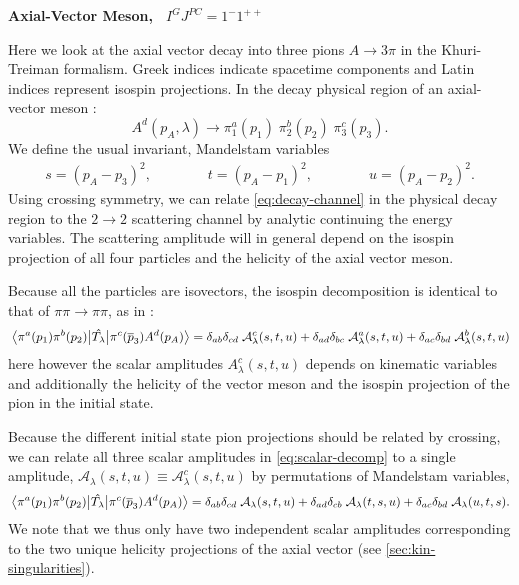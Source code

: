 \documentclass[10pt, aps,prd,amsmath,amssymb,superscriptaddress,onecolumn,
nofootinbib,showpacs,preprintnumbers]{revtex4-1}
\begin{document}
\begin{center}
\large \textbf{Axial-Vector Meson, \, \(I^G J^{PC} = 1^-1^{++}\)}
\end{center}
Here we look at the axial vector decay into three pions \(A \to 3\pi\) in the Khuri-Treiman formalism. Greek indices indicate spacetime components and Latin indices represent isospin projections.
In the decay physical region of an axial-vector meson :
  \begin{equation}
    \label{eq:decay-channel}
    A^d(p_A, \lambda) \rightarrow \pi_1^a(p_1)\;  \pi_2^b(p_2) \; \pi^c_3(p_3).
  \end{equation}
We define the usual invariant, Mandelstam variables
  \begin{align}
    s = (p_A - p_3)^2,  \qquad \qquad t = (p_A - p_1)^2,  \qquad  \qquad u = (p_A-p_2)^2.
  \end{align}
Using crossing symmetry, we can relate \cref{eq:decay-channel} in the physical decay region to the \(2\to2\) scattering channel by analytic continuing the energy variables. The scattering amplitude will in general depend on the isospin projection of all four particles and the helicity of the axial vector meson.

Because all the particles are isovectors, the isospin decomposition is identical to that of \(\pi\pi\to\pi\pi\), as in \cite{Albaladejo2018}:
  \begin{equation}
    \mel{\pi^a(p_1)\pi^b(p_2)}{\hat{T_\lambda}}{\pi^c(\overline{p}_3)A^d(p_A)} = \delta_{ab}\delta_{cd} \; \mathcal{A}^{c}_\lambda(s,t,u) + \delta_{ad}\delta_{bc} \; \mathcal{A}^{a}_\lambda(s,t,u) + \delta_{ac}\delta_{bd} \; \mathcal{A}^{b}_\lambda(s,t,u)
  \end{equation}
here however the scalar amplitudes \(A^c_\lambda(s,t,u)\) depends on kinematic variables and additionally the helicity of the vector meson and the isospin projection of the pion in the initial state.

Because the different initial state pion projections should be related by crossing, we can relate all three scalar amplitudes in \cref{eq:scalar-decomp} to a single amplitude, \(\mathcal{A}_\lambda(s,t,u) \equiv \mathcal{A}_\lambda^{c}(s,t,u)\) by permutations of Mandelstam variables,
\begin{equation}
  \label{eq:scalar-decomp}
  \mel{\pi^a(p_1)\pi^b(p_2)}{\hat{T_\lambda}}{\pi^c(\overline{p}_3)A^d(p_A)} = \delta_{ab}\delta_{cd} \; \mathcal{A}_\lambda(s,t,u) + \delta_{ad}\delta_{cb} \; \mathcal{A}_\lambda(t,s,u) + \delta_{ac}\delta_{bd} \; \mathcal{A}_\lambda(u,t,s).
\end{equation}
We note that we thus only have two independent scalar amplitudes corresponding to the two unique helicity projections of the axial vector (see \cref{sec:kin-singularities}).
\end{document}
